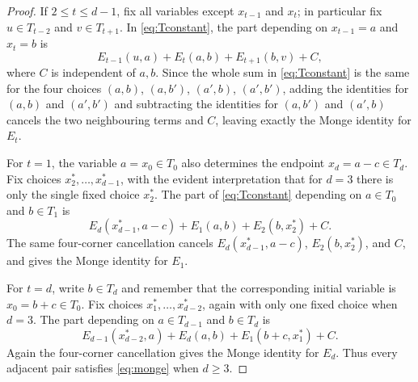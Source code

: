 \documentclass[11pt]{article}
\theoremstyle{definition}
\theoremstyle{remark}
\begin{document}
\begin{proof}
If $2\le t\le d-1$, fix all variables except $x_{t-1}$ and $x_t$; in particular fix $u\in T_{t-2}$ and $v\in T_{t+1}$.  In \eqref{eq:Tconstant}, the part depending on $x_{t-1}=a$ and $x_t=b$ is
\[
        E_{t-1}(u,a)+E_t(a,b)+E_{t+1}(b,v)+C,
\]
where $C$ is independent of $a,b$.  Since the whole sum in \eqref{eq:Tconstant} is the same for the four choices $(a,b)$, $(a,b')$, $(a',b)$, $(a',b')$, adding the identities for $(a,b)$ and $(a',b')$ and subtracting the identities for $(a,b')$ and $(a',b)$ cancels the two neighbouring terms and $C$, leaving exactly the Monge identity for $E_t$.

For $t=1$, the variable $a=x_0\in T_0$ also determines the endpoint $x_d=a-c\in T_d$.  Fix choices $x_2^*,\ldots,x_{d-1}^*$, with the evident interpretation that for $d=3$ there is only the single fixed choice $x_2^*$.  The part of \eqref{eq:Tconstant} depending on $a\in T_0$ and $b\in T_1$ is
\[
        E_d(x_{d-1}^*,a-c)+E_1(a,b)+E_2(b,x_2^*)+C .
\]
The same four-corner cancellation cancels $E_d(x_{d-1}^*,a-c)$, $E_2(b,x_2^*)$, and $C$, and gives the Monge identity for $E_1$.

For $t=d$, write $b\in T_d$ and remember that the corresponding initial variable is $x_0=b+c\in T_0$.  Fix choices $x_1^*,\ldots,x_{d-2}^*$, again with only one fixed choice when $d=3$.  The part depending on $a\in T_{d-1}$ and $b\in T_d$ is
\[
        E_{d-1}(x_{d-2}^*,a)+E_d(a,b)+E_1(b+c,x_1^*)+C .
\]
Again the four-corner cancellation gives the Monge identity for $E_d$.  Thus every adjacent pair satisfies \eqref{eq:monge} when $d\ge3$.


\end{proof}
\end{document}
